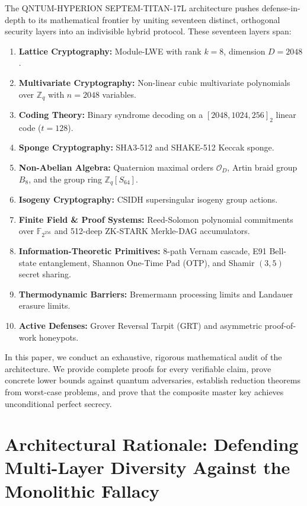 \documentclass{ieeeaccess}
\newcommand{\Z}{\mathbb{Z}}
\newcommand{\F}{\mathbb{F}}
\newcommand{\calO}{\mathcal{O}}
\begin{document}
The \textsc{QNTUM-HYPERION SEPTEM-TITAN-17L} architecture pushes defense-in-depth to its mathematical frontier by uniting seventeen distinct, orthogonal security layers into an indivisible hybrid protocol. These seventeen layers span:
\begin{enumerate}
  \item \textbf{Lattice Cryptography:} Module-LWE with rank $k=8$, dimension $D=2048$.
  \item \textbf{Multivariate Cryptography:} Non-linear cubic multivariate polynomials over $\Z_q$ with $n=2048$ variables.
  \item \textbf{Coding Theory:} Binary syndrome decoding on a $[2048, 1024, 256]_2$ linear code ($t=128$).
  \item \textbf{Sponge Cryptography:} SHA3-512 and SHAKE-512 Keccak sponge.
  \item \textbf{Non-Abelian Algebra:} Quaternion maximal orders $\calO_D$, Artin braid group $B_8$, and the group ring $\Z_q[S_{64}]$.
  \item \textbf{Isogeny Cryptography:} CSIDH supersingular isogeny group actions.
  \item \textbf{Finite Field \& Proof Systems:} Reed-Solomon polynomial commitments over $\F_{2^{256}}$ and 512-deep ZK-STARK Merkle-DAG accumulators.
  \item \textbf{Information-Theoretic Primitives:} 8-path Vernam cascade, E91 Bell-state entanglement, Shannon One-Time Pad (OTP), and Shamir $(3,5)$ secret sharing.
  \item \textbf{Thermodynamic Barriers:} Bremermann processing limits and Landauer erasure limits.
  \item \textbf{Active Defenses:} Grover Reversal Tarpit (GRT) and asymmetric proof-of-work honeypots.
\end{enumerate}

In this paper, we conduct an exhaustive, rigorous mathematical audit of the architecture. We provide complete proofs for every verifiable claim, prove concrete lower bounds against quantum adversaries, establish reduction theorems from worst-case problems, and prove that the composite master key achieves unconditional perfect secrecy.


\section{Architectural Rationale: Defending Multi-Layer Diversity Against the Monolithic Fallacy}
\label{sec:rationale}
\end{document}

